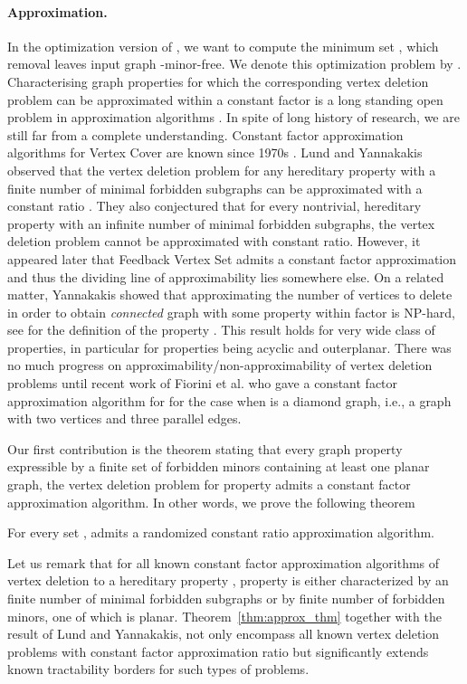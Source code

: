 \paragraph{Approximation.} In the optimization version of \fd{}, we want to 
compute the minimum set , which removal leaves input graph    -minor-free. We denote this optimization problem by \ofd.
Characterising graph  properties  for which the corresponding vertex deletion problem can be approximated 
within a constant factor is a long standing open problem in approximation algorithms  \cite{Yannakakis94}.
In spite of long history of research, we are still far from a complete understanding. 
Constant factor approximation algorithms  for  {\sc Vertex Cover}  are known since 1970s \cite{NemT74,Bar-YehudaE81}.
 Lund and Yannakakis observed that 
 the	vertex deletion	problem	for	any	hereditary	property	with	a finite number of minimal forbidden subgraphs can be approximated with a constant ratio \cite{LundY93}. They also conjectured that 
   for every nontrivial, hereditary property with an infinite number of minimal forbidden subgraphs, the  vertex deletion problem cannot be approximated with constant ratio.  However, it appeared later that   {\sc  Feedback Vertex Set} admits  a constant factor approximation~\cite{BarYGJ98,BafnaBF99}
  and thus  the dividing line of   approximability lies somewhere else.
  On a related matter, Yannakakis  \cite{Yannakakis79} showed that  approximating  the number of vertices to delete in order to obtain  \emph{connected} graph with some property  within factor  is NP-hard, see
\cite{Yannakakis79} for the definition of the property .  This result holds for very wide class of  properties, in particular for  properties  being acyclic and  outerplanar.  There was no much progress on approximability/non-approximability of vertex deletion  problems until recent work of Fiorini et al.  \cite{Fiorini:2009ipco} who gave  a constant factor approximation algorithm for 
 \fd{} for the case when  is a diamond graph, i.e., a graph with two vertices and three parallel edges.
 
Our  first contribution   is the theorem stating that  every graph property  expressible by a finite set of forbidden minors containing at least one planar graph, the	vertex deletion	problem for property  admits a constant factor approximation algorithm. In other words, we prove the following theorem
\begin{theorem}\label{thm:approx_thm}
For every set  , 
\ofd{}
admits a  randomized constant  ratio approximation algorithm. 
\end{theorem}
Let us remark that for all known constant factor approximation algorithms of vertex deletion to a  hereditary property , property  is either
  characterized by an   finite number of minimal forbidden subgraphs or by finite number of forbidden minors, one of which is planar.   Theorem~\ref{thm:approx_thm} together with the result of Lund and Yannakakis, not only encompass all known  vertex deletion problems with constant factor approximation ratio but significantly extends   known tractability 
  borders for   such types of problems.
 

